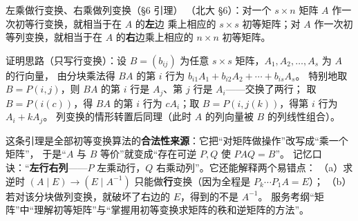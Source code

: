 \begin{fdeep}{左乘做行变换、右乘做列变换（§6 引理）}
（北大 §6）：对一个 $s\times n$ 矩阵 $A$ 作一次初等行变换，就相当于在 $A$ 的\textbf{左}边
乘上相应的 $s\times s$ 初等矩阵；对 $A$ 作一次初等列变换，就相当于在 $A$ 的\textbf{右}边乘上相应的
$n\times n$ 初等矩阵。

证明思路（只写行变换）：设 $B=(b_{ij})$ 为任意 $s\times s$ 矩阵，$A_1,A_2,\dots,A_s$ 为 $A$ 的行向量，
由分块乘法得 $BA$ 的第 $i$ 行为 $b_{i1}A_1+b_{i2}A_2+\cdots+b_{is}A_s$。
特别地取 $B=P(i,j)$，则 $BA$ 的第 $i$ 行是 $A_j$、第 $j$ 行是 $A_i$——交换了两行；
取 $B=P(i(c))$，得 $BA$ 的第 $i$ 行为 $cA_i$；取 $B=P(i,j(k))$，得第 $i$ 行为 $A_i+kA_j$。
列变换的情形转置后同理（此时 $A$ 的列向量被 $B$ 的列线性组合）。

这条引理是全部初等变换算法的\textbf{合法性来源}：它把“对矩阵做操作”改写成“乘一个矩阵”，
于是“$A$ 与 $B$ 等价”就变成“存在可逆 $P,Q$ 使 $PAQ=B$”。
记忆口诀：“\textbf{左行右列}——$P$ 左乘动行，$Q$ 右乘动列”。它还能解释两个易错点：
（a）求逆时 $(A\mid E)\to(E\mid A^{-1})$ 只能做\textbf{行}变换（因为全程是 $P_k\cdots P_1A=E$）；
（b）若对该分块做列变换，就破坏了右边的 $E$，得到的不是 $A^{-1}$。
\fbref{}服务考纲“矩阵”中“理解初等矩阵”与“掌握用初等变换求矩阵的秩和逆矩阵的方法”。
\end{fdeep}

